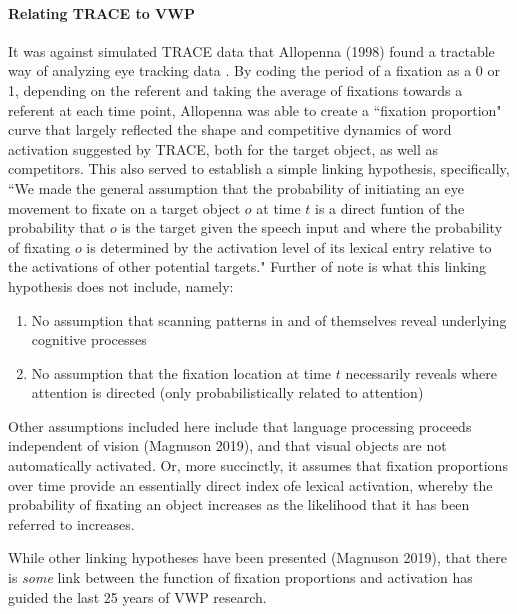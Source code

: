 \documentclass{article}
\begin{document}
\paragraph{Relating TRACE to VWP} It was against simulated TRACE data that Allopenna (1998) found a tractable way of analyzing eye tracking data \cite{allopenna1998tracking}. By coding the period of a fixation as a 0 or 1, depending on the referent and taking the average of fixations towards a referent at each time point, Allopenna was able to create a ``fixation proportion" curve that largely reflected the shape and competitive dynamics of word activation suggested by TRACE, both for the target object, as well as competitors. This also served to establish a simple linking hypothesis, specifically, ``We made the general assumption that the probability of initiating an eye movement to fixate on a target object $o$ at time $t$ is a direct funtion of the probability that $o$ is the target given the speech input and where the probability of fixating $o$ is determined by the activation level of its lexical entry relative to the activations of other potential targets." Further of note is what this linking hypothesis does not include, namely:

\begin{singlespace}
\begin{enumerate}
\vspace{-3mm}
\item No assumption that scanning patterns in and of themselves reveal underlying cognitive processes
\item No assumption that the fixation location at time $t$ necessarily reveals where attention is directed (only probabilistically related to attention)
\end{enumerate}
\end{singlespace}

Other assumptions included here include that language processing proceeds independent of vision (Magnuson 2019), and that visual objects are not automatically activated. Or, more succinctly, it assumes that fixation proportions over time provide an essentially direct index ofe lexical activation, whereby the probability of fixating an object increases as the likelihood that it has been referred to increases.


While other linking hypotheses have been presented (Magnuson 2019), that there is \textit{some} link between the function of fixation proportions and activation has guided the last 25 years of VWP research.
\end{document}
